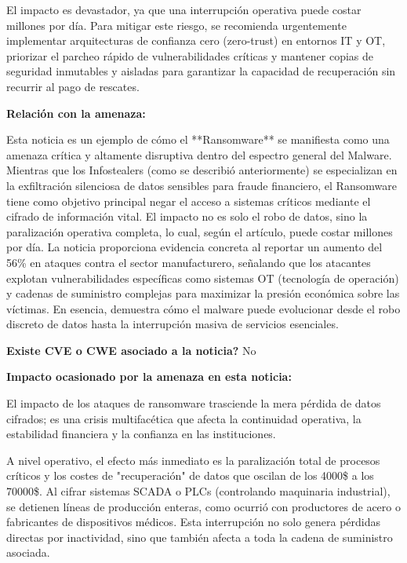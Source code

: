 \begin{tcolorbox}
El impacto es devastador, ya que una interrupción operativa puede costar millones por día. Para mitigar este riesgo, se recomienda urgentemente implementar arquitecturas de confianza cero (zero-trust) en entornos IT y OT, priorizar el parcheo rápido de vulnerabilidades críticas y mantener copias de seguridad inmutables y aisladas para garantizar la capacidad de recuperación sin recurrir al pago de rescates.
    
    \textbf{Relación con la amenaza:}
    \vspace{0.5em}

    Esta noticia es un ejemplo de cómo el **Ransomware** se manifiesta como una amenaza crítica y altamente disruptiva dentro del espectro general del Malware. Mientras que los Infostealers (como se describió anteriormente) se especializan en la exfiltración silenciosa de datos sensibles para fraude financiero, el Ransomware tiene como objetivo principal negar el acceso a sistemas críticos mediante el cifrado de información vital. El impacto no es solo el robo de datos, sino la paralización operativa completa, lo cual, según el artículo, puede costar millones por día. La noticia proporciona evidencia concreta al reportar un aumento del 56\% en ataques contra el sector manufacturero, señalando que los atacantes explotan vulnerabilidades específicas como sistemas OT (tecnología de operación) y cadenas de suministro complejas para maximizar la presión económica sobre las víctimas. En esencia, demuestra cómo el malware puede evolucionar desde el robo discreto de datos hasta la interrupción masiva de servicios esenciales.

    \textbf{\textquestiondown Existe CVE o CWE asociado a la noticia?}
    No
    \vspace{0.5em}

    \textbf{Impacto ocasionado por la amenaza en esta noticia:}
    \vspace{0.5em}

    El impacto de los ataques de ransomware trasciende la mera pérdida de datos cifrados; es una crisis multifacética que afecta la continuidad operativa, la estabilidad financiera y la confianza en las instituciones.

A nivel operativo, el efecto más inmediato es la paralización total de procesos críticos y los costes de "recuperación" de datos que oscilan de los 4000\$ a los 70000\$. Al cifrar sistemas SCADA o PLCs (controlando maquinaria industrial), se detienen líneas de producción enteras, como ocurrió con productores de acero o fabricantes de dispositivos médicos. Esta interrupción no solo genera pérdidas directas por inactividad, sino que también afecta a toda la cadena de suministro asociada.


\end{tcolorbox}
